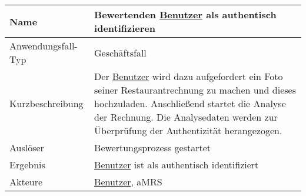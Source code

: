 \begin{table}[H]
    \centering
    \label{}
    \begin{tabularx}{\textwidth}{| l | X |}
        \hline
        Name               & Bewertenden \hyperref[gls:nutzer]{Benutzer} als authentisch identifizieren                                                                                                                                                                             \\
        \hline
        Anwendungsfall-Typ & Geschäftsfall                                                                                                                                                                                                                                          \\
        \hline
        Kurzbeschreibung   & Der \hyperref[gls:nutzer]{Benutzer} wird dazu aufgefordert ein Foto seiner Restaurantrechnung zu machen und dieses hochzuladen. Anschließend startet die Analyse der Rechnung. Die Analysedaten werden zur Überprüfung der Authentizität herangezogen. \\
        \hline
        Auslöser           & Bewertungsprozess gestartet                                                                                                                                                                                                                            \\
        \hline
        Ergebnis           & \hyperref[gls:nutzer]{Benutzer} ist als authentisch identifiziert                                                                                                                                                                                      \\
        \hline
        Akteure            & \hyperref[gls:nutzer]{Benutzer}, \ac{aMRS}                                                                                                                                                                                                             \\
        \hline
    \end{tabularx}
\end{table}

